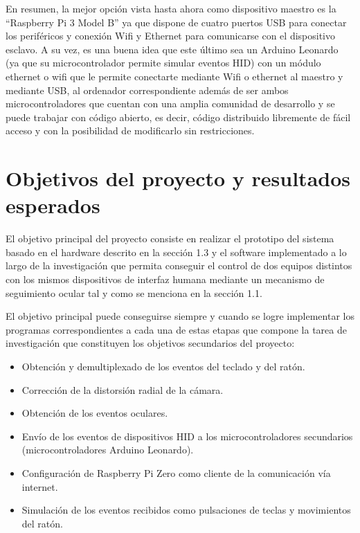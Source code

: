 En resumen, la mejor opción vista hasta ahora como dispositivo maestro es la “Raspberry Pi 3 Model B” ya que dispone de cuatro puertos USB para conectar los periféricos y conexión Wifi y Ethernet para comunicarse con el dispositivo esclavo. A su vez, es una buena idea que este último sea un Arduino Leonardo (ya que su microcontrolador permite simular eventos HID) con un módulo ethernet o wifi que le permite conectarte mediante Wifi o ethernet al maestro y mediante USB, al ordenador correspondiente además de ser ambos microcontroladores que cuentan con una amplia comunidad de desarrollo y se puede trabajar con código abierto, es decir, código distribuido libremente de fácil acceso y con la posibilidad de modificarlo sin restricciones.


\section{Objetivos del proyecto y resultados esperados} \label{s1_4}

El objetivo principal del proyecto consiste en realizar el prototipo del sistema basado en el hardware descrito en la sección 1.3 y el software implementado a lo largo de la investigación que permita conseguir el control de dos equipos distintos con los mismos dispositivos de interfaz humana mediante un mecanismo de seguimiento ocular tal y como se menciona en la sección 1.1. 

El objetivo principal puede conseguirse siempre y cuando se logre implementar los programas correspondientes a cada una de estas etapas que compone la tarea de investigación que constituyen los objetivos secundarios del proyecto:
\begin{itemize}
    \item Obtención y demultiplexado de los eventos del teclado y del ratón.
    \item Corrección de la distorsión radial de la cámara.
    \item Obtención de los eventos oculares.
    \item Envío de los eventos de dispositivos HID a los microcontroladores secundarios (microcontroladores Arduino Leonardo).
    \item Configuración de Raspberry Pi Zero como cliente de la comunicación vía internet.
    \item Simulación de los eventos recibidos como pulsaciones de teclas y movimientos del ratón.

\end{itemize}

